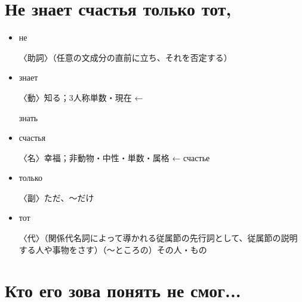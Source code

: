 \documentclass[12pt]{ltjsarticle}
\begin{document}
\bigskip

\section{Не знает счастья только тот,}

\begin{itemize}
    \item \begin{russian}не\end{russian}  〈助詞〉（任意の文成分の直前に立ち、それを否定する）
    \item \begin{russian}знает\end{russian}  〈動〉知る；3人称単数・現在 ← \begin{russian}знать\end{russian} 
    \item \begin{russian}счастья\end{russian}  〈名〉幸福；非動物・中性・単数・属格 ← счастье 
    \item \begin{russian}только\end{russian}  〈副〉ただ、〜だけ
    \item \begin{russian}тот\end{russian} 〈代〉（関係代名詞によって導かれる従属節の先行詞として、従属節の説明する人や事物をさす）（〜ところの）その人・もの
\end{itemize}

\bigskip

\section{Кто его зова понять не смог...}
\end{document}

